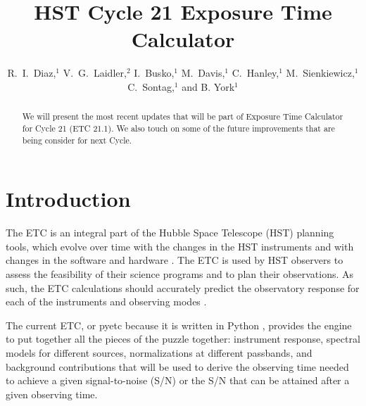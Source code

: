 
\resetcounters




\title{HST Cycle 21 Exposure Time Calculator}
\author{R.~I.~Diaz,$^1$ V.~G.~Laidler,$^2$ I.~Busko,$^1$ M.~Davis,$^1$ C.~Hanley,$^1$ M.~Sienkiewicz,$^1$ C.~Sontag,$^1$ and B. York$^1$
}


\begin{abstract}
We will present the most recent updates that will be part of Exposure Time Calculator for Cycle 21 (ETC 21.1). We also touch on some of the future improvements that are being consider for next Cycle. 
\end{abstract}

\section{Introduction}
The ETC is an integral part of the  Hubble Space Telescope (HST) planning tools, which evolve over time with the changes in the HST instruments and with changes in the software and hardware \citep{Diaz3_2010, Diazetal_2010}. The ETC is used by HST observers to assess the feasibility of their science programs and to plan their observations. As such, the ETC calculations should accurately predict the observatory response for each of the instruments and observing modes \citep{Diaz_2012}.

The current ETC, or pyetc because it is written in Python \citep{pyetc2010}, provides the engine to put together all the pieces of the puzzle together: instrument response, spectral models for different sources, normalizations at different passbands, and background contributions that will be used to derive the observing time needed to achieve a given signal-to-noise (S/N) or the S/N that can be attained after a given observing time.

